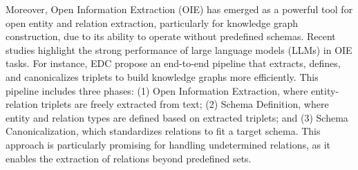 Moreover, Open Information Extraction (OIE) has emerged as a powerful tool for open entity and relation extraction, particularly for knowledge graph construction, due to its ability to operate without predefined schemas. Recent studies \citep{li2023evaluating} highlight the strong performance of large language models (LLMs) in OIE tasks. For instance, EDC \citep{zhang-soh-2024-extract} propose an end-to-end pipeline that extracts, defines, and canonicalizes triplets to build knowledge graphs more efficiently. This pipeline includes three phases: (1) Open Information Extraction, where entity-relation triplets are freely extracted from text; (2) Schema Definition, where entity and relation types are defined based on extracted triplets; and (3) Schema Canonicalization, which standardizes relations to fit a target schema. This approach is particularly promising for handling undetermined relations, as it enables the extraction of relations beyond predefined sets.


